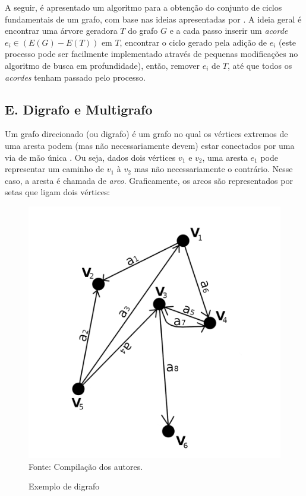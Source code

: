 \documentclass[twocolumn, 10pt]{extarticle}
\begin{document}
A seguir, é apresentado um algoritmo para a obtenção do conjunto de ciclos fundamentais de um grafo, com base nas ideias apresentadas por \cite{krishna}. A ideia geral é encontrar uma árvore geradora $T$ do grafo $G$ e a cada passo inserir um \textit{acorde} $e_i \in (E(G)-E(T))$ em $T$, encontrar o ciclo gerado pela adição de $e_i$ (este processo pode ser facilmente implementado através de pequenas modificações no algoritmo de busca em profundidade), então, remover $e_i$ de $T$, até que todos os \textit{acordes} tenham passado pelo processo.

\begingroup
{}\label{lp}
\begin{algorithmic}[1]
	\EndFor
\EndFunction
\end{algorithmic}
\hrulefill
\endgroup

\subsection*{E. \quad Digrafo e Multigrafo}

Um grafo direcionado (ou digrafo) é um grafo no qual os vértices extremos de uma aresta podem (mas não necessariamente devem) estar conectados por uma via de mão única \cite[p. 566]{sedgewick}. Ou seja, dados dois vértices $v_1$ e $v_2$, uma aresta $e_1$ pode representar um caminho de $v_1$ à $v_2$ mas não necessariamente o contrário. Nesse caso, a aresta é chamada de \textit{arco}. Graficamente, os arcos são representados por setas que ligam dois vértices:

\begin{figure}[H]
	\caption{Exemplo de digrafo} 
	\centering
	\includegraphics[scale=0.7]{digrafo1}
	\\ Fonte: Compilação dos autores.
\end{figure}
\end{document}
